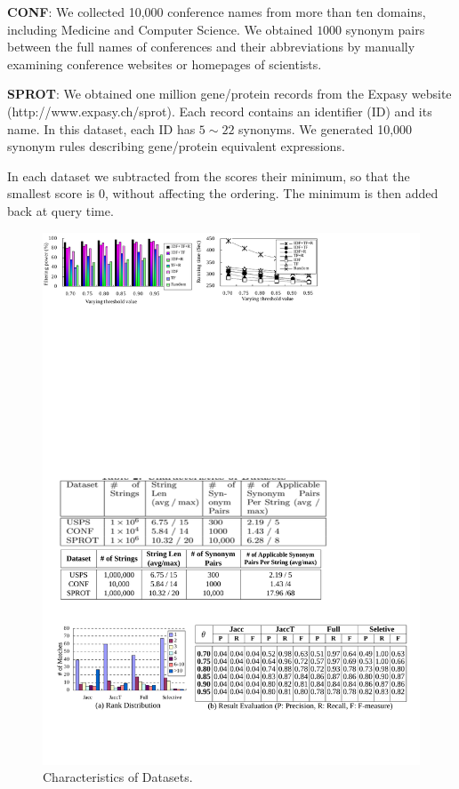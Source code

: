 \documentclass{sig-alternate}
\begin{document}
\noindent \textbf{{CONF}}: We collected 10,000 conference names
from more than ten domains, including Medicine and Computer
Science.
We obtained $1000$ synonym pairs between the full names of conferences and their
abbreviations by manually examining conference websites or homepages
of scientists.


\noindent \textbf{{SPROT}}: We obtained one million gene/protein records
from the Expasy website ({\footnotesize http://www.expasy.ch/sprot}).
Each record contains an identifier (ID) and its name.
In this dataset, each ID has $5\sim22$ synonyms. We generated 10,000 synonym rules describing gene/protein
equivalent expressions.

In each dataset we subtracted from the scores their minimum,
so that the smallest score is 0, without affecting the
ordering. The minimum is then added back at query time.




\begin{figure}
  \small
  \centering
  \includegraphics[width=\linewidth]{figures/Characteristics_Datasets}
   \vspace{-6mm}
  \caption{Characteristics of Datasets.}
  \label{tab:data_characteristics}
\end{figure}
\end{document}
